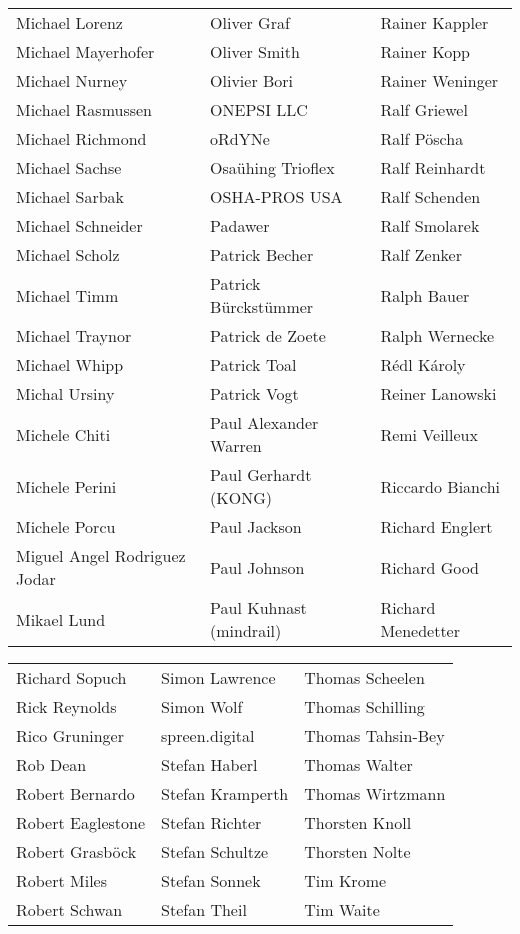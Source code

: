 \begin{small}
\begin{tabular}{p{4cm}p{4cm}p{4cm}}
Michael Lorenz & Oliver Graf & Rainer Kappler \\
Michael Mayerhofer & Oliver Smith & Rainer Kopp \\
Michael Nurney & Olivier Bori & Rainer Weninger \\
Michael Rasmussen & ONEPSI LLC & Ralf Griewel \\
Michael Richmond & oRdYNe & Ralf Pöscha \\
Michael Sachse & Osaühing Trioflex & Ralf Reinhardt \\
Michael Sarbak & OSHA-PROS USA & Ralf Schenden \\
Michael Schneider & Padawer & Ralf Smolarek \\
Michael Scholz & Patrick Becher & Ralf Zenker \\
Michael Timm & Patrick Bürckstümmer & Ralph Bauer \\
Michael Traynor & Patrick de Zoete & Ralph Wernecke \\
Michael Whipp & Patrick Toal & Rédl Károly \\
Michal Ursiny & Patrick Vogt & Reiner Lanowski \\
Michele Chiti & Paul Alexander Warren & Remi Veilleux \\
Michele Perini & Paul Gerhardt (KONG) & Riccardo Bianchi \\
Michele Porcu & Paul Jackson & Richard Englert \\
Miguel Angel Rodriguez Jodar & Paul Johnson & Richard Good \\
Mikael Lund & Paul Kuhnast (mindrail) & Richard Menedetter \\
\end{tabular}
\newpage
\setlength{\tabcolsep}{1mm}
\begin{tabular}{p{4cm}p{4cm}p{4cm}}
Richard Sopuch & Simon Lawrence & Thomas Scheelen \\
Rick Reynolds & Simon Wolf & Thomas Schilling \\
Rico Gruninger & spreen.digital & Thomas Tahsin-Bey \\
Rob Dean & Stefan Haberl & Thomas Walter \\
Robert Bernardo & Stefan Kramperth & Thomas Wirtzmann \\
Robert Eaglestone & Stefan Richter & Thorsten Knoll \\
Robert Grasböck & Stefan Schultze & Thorsten Nolte \\
Robert Miles & Stefan Sonnek & Tim Krome \\
Robert Schwan & Stefan Theil & Tim Waite \\

\end{tabular}
\end{small}

